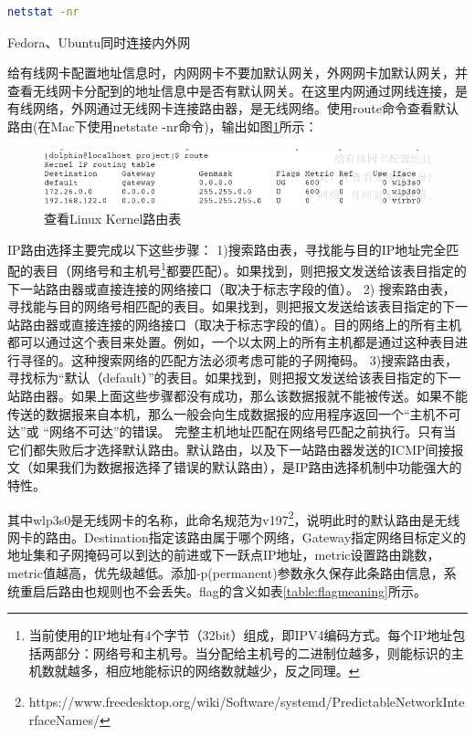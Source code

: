\documentclass[12pt]{book}
\makeatletter
\numberwithin{dummy}{section}
\theoremstyle{ocrenumbox}
\theoremstyle{blacknumex}
\theoremstyle{blacknumbox}
\theoremstyle{ocrenum}
\renewcommand\paragraph{\@startsection{paragraph}{4}{\z@}
	{-2ex \@plus-.2ex \@minus .2ex}
	{.1ex}
	{\normalfont\small\sffamily\bfseries}}
\makeatother
\begin{document}
\begin{lstlisting}[language=Bash]
netstat -nr
\end{lstlisting}

\paragraph{Fedora、Ubuntu同时连接内外网}

给有线网卡配置地址信息时，内网网卡不要加默认网关，外网网卡加默认网关，并查看无线网卡分配到的地址信息中是否有默认网关。在这里内网通过网线连接，是有线网络，外网通过无线网卡连接路由器，是无线网络。使用route命令查看默认路由(在Mac下使用netstate -nr命令)，输出如图\ref{fig:routetable}所示：

\begin{figure}[htbp]
	\centering
	\includegraphics[scale=0.5]{route-table.jpg}
	\caption{查看Linux Kernel路由表}
	\label{fig:routetable}
\end{figure}

IP路由选择主要完成以下这些步骤：
1)搜索路由表，寻找能与目的IP地址完全匹配的表目（网络号和主机号\footnote{当前使用的IP地址有4个字节（32bit）组成，即IPV4编码方式。每个IP地址包括两部分：网络号和主机号。当分配给主机号的二进制位越多，则能标识的主机数就越多，相应地能标识的网络数就越少，反之同理。}都要匹配）。如果找到，则把报文发送给该表目指定的下一站路由器或直接连接的网络接口（取决于标志字段的值）。
2) 搜索路由表，寻找能与目的网络号相匹配的表目。如果找到，则把报文发送给该表目指定的下一站路由器或直接连接的网络接口（取决于标志字段的值）。目的网络上的所有主机都可以通过这个表目来处置。例如，一个以太网上的所有主机都是通过这种表目进行寻径的。这种搜索网络的匹配方法必须考虑可能的子网掩码。
3)搜索路由表，寻找标为“默认（default）”的表目。如果找到，则把报文发送给该表目指定的下一站路由器。如果上面这些步骤都没有成功，那么该数据报就不能被传送。如果不能传送的数据报来自本机，那么一般会向生成数据报的应用程序返回一个“主机不可达”或 “网络不可达”的错误。
完整主机地址匹配在网络号匹配之前执行。只有当它们都失败后才选择默认路由。默认路由，以及下一站路由器发送的ICMP间接报文（如果我们为数据报选择了错误的默认路由），是IP路由选择机制中功能强大的特性。

其中wlp3s0是无线网卡的名称，此命名规范为v197\footnote{https://www.freedesktop.org/wiki/Software/systemd/PredictableNetworkInterfaceNames/}，说明此时的默认路由是无线网卡的路由。Destination指定该路由属于哪个网络，Gateway指定网络目标定义的地址集和子网掩码可以到达的前进或下一跃点IP地址，metric设置路由跳数，metric值越高，优先级越低。添加-p(permanent)参数永久保存此条路由信息，系统重启后路由也规则也不会丢失。flag的含义如表\ref{table:flagmeaning}所示。
\end{document}

